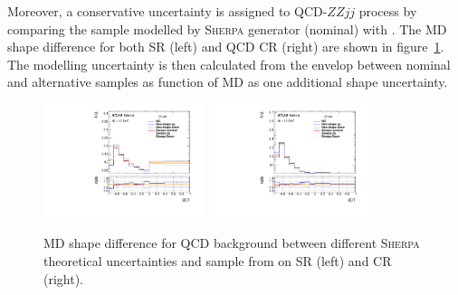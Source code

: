 Moreover, a conservative uncertainty is assigned to QCD-$ZZjj$ process by comparing the sample modelled by \textsc{Sherpa} generator (nominal) with \MGMCatNLO.
The MD shape difference for both SR (left) and QCD CR (right) are shown in figure~\ref{fig:sys_exp_shmg}.
The modelling uncertainty is then calculated from the envelop between nominal and alternative samples as function of MD as one additional shape uncertainty.
\begin{figure}
  \centering
  \includegraphics[width=0.42\textwidth]{figures/VBSZZ/syst/BDT_shape_nor_linear_SR.pdf}
  \includegraphics[width=0.42\textwidth]{figures/VBSZZ/syst/BDT_shape_nor_linear_CR.pdf}
  \caption{MD shape difference for QCD \qqZZ background between different \textsc{Sherpa} theoretical uncertainties and sample from \MGMCatNLO on SR (left) and CR (right).}
  \label{fig:sys_exp_shmg}
\end{figure}

